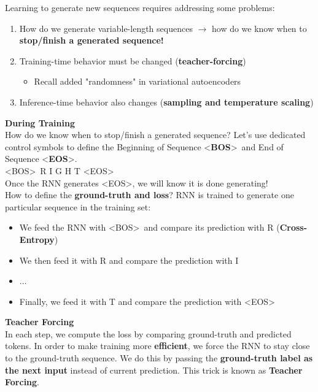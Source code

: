 Learning to generate new sequences requires addressing some problems:
\begin{enumerate}
    \item How do we generate variable-length sequences $\rightarrow$ how do we know when to \textbf{stop/finish a generated sequence!}
    \item Training-time behavior must be changed (\textbf{teacher-forcing})
    \begin{itemize}
        \item Recall added "randomness" in variational autoencoders
    \end{itemize}
    \item Inference-time behavior also changes (\textbf{sampling and temperature scaling})
\end{enumerate}

\noindent \textbf{During Training}\\

How do we know when to stop/finish a generated sequence? Let’s use dedicated control symbols to define the Beginning of Sequence \textless \textbf{BOS}\textgreater\ and End of Sequence \textless \textbf{EOS}\textgreater.\\

\textless BOS\textgreater\ R I G H T \textless EOS\textgreater\\

Once the RNN generates \textless EOS\textgreater, we will know it is done generating!\\

How to define the \textbf{ground-truth and loss}? RNN is trained to generate one particular sequence in the training set:
\begin{itemize}
    \item We feed the RNN with \textless BOS\textgreater\ and compare its prediction with R (\textbf{Cross-Entropy})
    \item We then feed it with R and compare the prediction with I
    \item $\ldots$
    \item Finally, we feed it with T and compare the prediction with \textless EOS\textgreater\\
\end{itemize}

\noindent \textbf{Teacher Forcing}\\

In each step, we compute the loss by comparing ground-truth and predicted tokens.
In order to make training more \textbf{efficient}, we force the RNN to stay close to the
ground-truth sequence.
We do this by passing the \textbf{ground-truth label as the next input} instead of current
prediction. This trick is known as \textbf{Teacher Forcing}.\\


